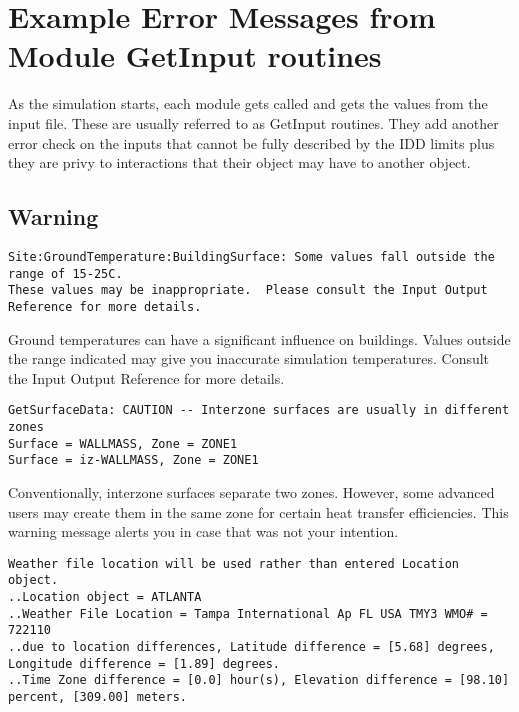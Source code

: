\section{Example Error Messages from Module GetInput routines}\label{example-error-messages-from-module-getinput-routines}

As the simulation starts, each module gets called and gets the values from the input file. These are usually referred to as GetInput routines. They add another error check on the inputs that cannot be fully described by the IDD limits plus they are privy to interactions that their object may have to another object.

\subsection{Warning}\label{warning-002}

\begin{lstlisting}
Site:GroundTemperature:BuildingSurface: Some values fall outside the range of 15-25C.
These values may be inappropriate.  Please consult the Input Output Reference for more details.
\end{lstlisting}

Ground temperatures can have a significant influence on buildings. Values outside the range indicated may give you inaccurate simulation temperatures. Consult the Input Output Reference for more details.

\begin{lstlisting}
GetSurfaceData: CAUTION -- Interzone surfaces are usually in different zones
Surface = WALLMASS, Zone = ZONE1
Surface = iz-WALLMASS, Zone = ZONE1
\end{lstlisting}

Conventionally, interzone surfaces separate two zones. However, some advanced users may create them in the same zone for certain heat transfer efficiencies. This warning message alerts you in case that was not your intention.

\begin{lstlisting}
Weather file location will be used rather than entered Location object.
..Location object = ATLANTA
..Weather File Location = Tampa International Ap FL USA TMY3 WMO# = 722110
..due to location differences, Latitude difference = [5.68] degrees, Longitude difference = [1.89] degrees.
..Time Zone difference = [0.0] hour(s), Elevation difference = [98.10] percent, [309.00] meters.
\end{lstlisting}

